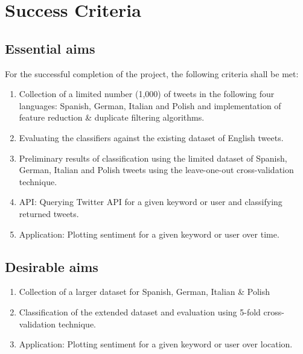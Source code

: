 \section{Success Criteria}

\subsection*{Essential aims}

For the successful completion of the project, the following criteria shall be met:

\begin{enumerate}

\item Collection of a limited number (1,000) of tweets in the following four languages: Spanish, German, Italian and Polish and implementation of feature reduction \& duplicate filtering algorithms.

\item Evaluating the classifiers against the existing dataset of English tweets.

\item Preliminary results of classification using the limited dataset of Spanish, German, Italian and Polish tweets using the leave-one-out cross-validation technique.

\item API: Querying Twitter API for a given keyword or user and classifying returned tweets.

\item Application: Plotting sentiment for a given keyword or user over time.

\end{enumerate}

\subsection*{Desirable aims}

\begin{enumerate}

\item Collection of a larger dataset for Spanish, German, Italian \& Polish

\item Classification of the extended dataset and evaluation using 5-fold cross-validation technique.

\item Application: Plotting sentiment for a given keyword or user over location.

\end{enumerate}

